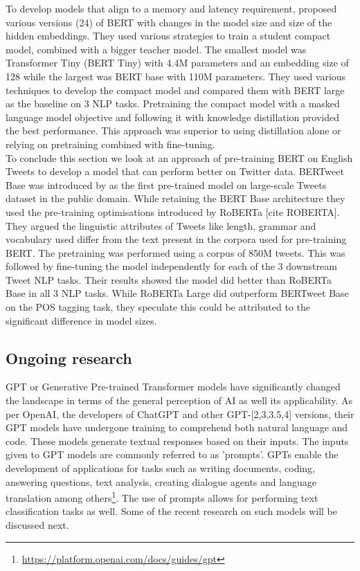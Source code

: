 To develop models that align to a memory and latency requirement, \cite{turcWellReadStudentsLearn2019} proposed various versions (24) of BERT with changes in the model size and size of the hidden embeddings. They used various strategies to train a student compact model, combined with a bigger teacher model. The smallest model was Transformer Tiny (BERT Tiny) with  4.4M parameters and an embedding size of 128 while the largest was BERT base with 110M parameters. They used various techniques to develop the compact model and compared them with BERT large as the baseline on 3 NLP tasks. Pretraining the compact model with a masked language model objective and following it with knowledge distillation provided the best performance. This approach was superior to using distillation alone or relying on pretraining combined with fine-tuning.\\

To conclude this section we look at an approach of pre-training BERT on English Tweets to develop a model that can perform better on Twitter data. BERTweet Base was introduced by \cite{nguyenBERTweetPretrainedLanguage2020} as the first pre-trained model on large-scale Tweets dataset in the public domain. While retaining the BERT Base architecture they used the pre-training optimisations introduced by RoBERTa [cite ROBERTA]. They argued the linguistic attributes of Tweets like length, grammar and vocabulary used differ from the text present in the corpora used for pre-training BERT. The pretraining was performed using a corpus of 850M tweets. This was followed by fine-tuning the model independently for each of the 3 downstream Tweet NLP tasks. Their results showed the model did better than RoBERTa Base in all 3 NLP tasks. While RoBERTa Large did outperform BERTweet Base on the POS tagging task, they speculate this could be attributed to the significant difference in model sizes.

\subsection{Ongoing research}
GPT or Generative Pre-trained Transformer models have significantly changed the landscape in terms of the general perception of AI as well its applicability. As per OpenAI, the developers of ChatGPT and other GPT-[2,3,3.5,4] versions, their GPT models have undergone training to comprehend both natural language and code. These models generate textual responses based on their inputs. The inputs given to GPT models are commonly referred to as 'prompts'. GPTs enable the development of applications for tasks such as writing documents, coding, answering questions, text analysis, creating dialogue agents and language translation among others\footnote{\url{https://platform.openai.com/docs/guides/gpt}}. The use of prompts allows for performing text classification tasks as well. Some of the recent research on such models will be discussed next.\\

